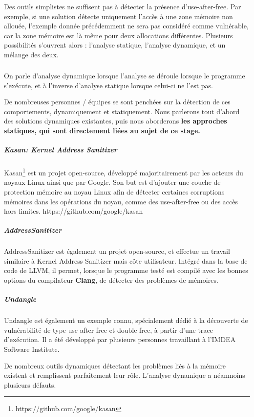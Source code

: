 Des outils simplistes ne suffisent pas à détecter la présence d'use-after-free.\newline
Par exemple, si une solution détecte uniquement l'accès à une zone mémoire non allouée, l'exemple
donnée précédemment ne sera pas considéré comme vulnérable, car la zone mémoire est là même pour deux
allocations différentes. Plusieurs possibilités s'ouvrent alors : l'analyse statique, l'analyse dynamique,
et un mélange des deux.\subparagraph{}
On parle d'analyse dynamique lorsque l'analyse se déroule lorsque le programme s'exécute, et à l'inverse d'analyse statique lorsque celui-ci ne l'est pas.

De nombreuses personnes / équipes se sont penchées sur la détection de ces comportements, dynamiquement et
statiquement. Nous parlerons tout d'abord des solutions dynamiques existantes, puis nous aborderons \textbf{les approches
statiques, qui sont directement liées au sujet de ce stage.}

\subparagraph{Kasan: Kernel Address Sanitizer}
Kasan\footnote{https://github.com/google/kasan} est un projet open-source, développé majoritairement
par les acteurs du noyaux Linux ainsi que par Google. Son but est d'ajouter une couche de protection
mémoire au noyau Linux afin de détecter certaines corruptions mémoires dans les opérations du noyau, comme
des use-after-free ou des accès hors limites.
https://github.com/google/kasan

\subparagraph{AddressSanitizer}
AddressSanitizer est également un projet open-source, et effectue
un travail similaire à Kernel Address Sanitizer mais côte utilisateur. Intégré dans la base de code de
LLVM, il permet, lorsque le programme testé est compilé avec les bonnes options du compilateur \textbf{Clang},
de détecter des problèmes de mémoires.

\subparagraph{Undangle}
Undangle est également un exemple connu, spécialement dédié à la découverte de vulnérabilité
de type use-after-free et double-free, à partir d'une trace d'exécution. Il a été développé par plusieurs
personnes travaillant à l'IMDEA Software Institute.


De nombreux outils dynamiques détectant les problèmes liés à la mémoire existent et remplissent parfaitement leur rôle.
L'analyse dynamique a néanmoins plusieurs défauts.\newline

